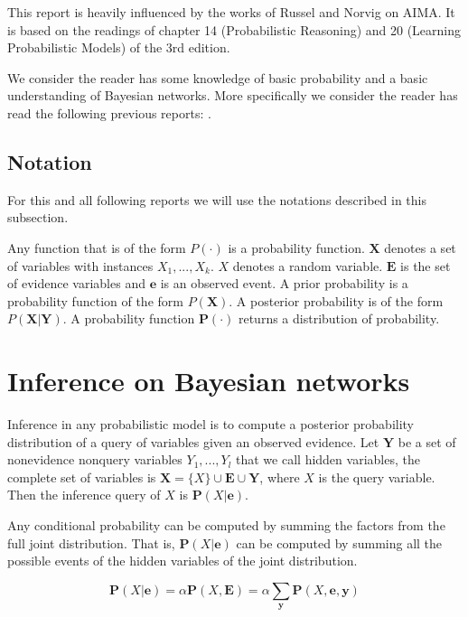 \documentclass[a4paper,10pt]{article}
\theoremstyle{plain}
\begin{document}
This report is heavily influenced by the works of Russel and Norvig on AIMA\cite{aima}. It is based
on the readings of chapter 14 (Probabilistic Reasoning) and 20 (Learning Probabilistic Models) of
the 3rd edition.

We consider the reader has some knowledge of basic probability and a basic understanding of
Bayesian networks. More specifically we consider the reader has read the following previous
reports: \cite{project-def, report-1, report-2, report-5, report-8, report-9}.

\subsection{Notation}

For this and all following reports we will use the notations described in this subsection.

Any function that is of the form $P(\cdot)$ is a probability function. $\mathbf{X}$ denotes a set
of variables with instances $X_1,...,X_k$. $X$ denotes a random variable. $\mathbf{E}$ is the set
of evidence variables and $\mathbf{e}$ is an observed event. A prior probability is a probability
function of the form $P(\mathbf{X})$. A posterior probability is of the form $P(\mathbf{X}|\mathbf{
Y})$. A probability function $\mathbf{P}(\cdot)$ returns a distribution of probability.

\section{Inference on Bayesian networks}

Inference in any probabilistic model is to compute a posterior probability distribution of a query
of variables given an observed evidence. Let $\mathbf{Y}$ be a set of nonevidence nonquery
variables $Y_1,...,Y_l$ that we call hidden variables, the complete set of variables is $\mathbf{X}
= \{X\} \cup \mathbf{E} \cup \mathbf{Y}$, where $X$ is the query variable. Then the inference query
of $X$ is $\mathbf{P}(X|\mathbf{e})$.

Any conditional probability can be computed by summing the factors from the full joint
distribution. That is, $\mathbf{P}(X|\mathbf{e})$ can be computed by summing all the possible
events of the hidden variables of the joint distribution.

\begin{equation}
  \mathbf{P}(X|\mathbf{e}) = \alpha \mathbf{P}(X, \mathbf{E}) = \alpha \sum_\mathbf{y} \mathbf{P}(
  X, \mathbf{e}, \mathbf{y})
\end{equation}
\end{document}
